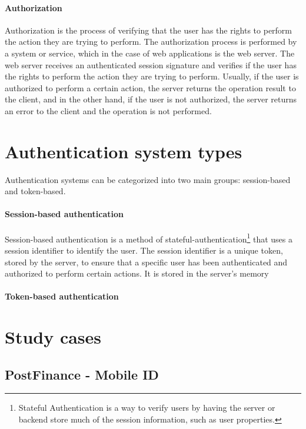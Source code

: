 \documentclass[12pt]{article}
\begin{document}
\paragraph{Authorization} Authorization is the process of verifying that the user has the rights to perform the action they are trying to perform. The authorization process is performed by a system or service, which in the case of web applications is the web server. The web server receives an authenticated session signature and verifies if the user has the rights to perform the action they are trying to perform. Usually, if the user is authorized to perform a certain action, the server returns the operation result to the client, and in the other hand, if the user is not authorized, the server returns an error to the client and the operation is not performed.

\pagebreak
\newpage

\section{Authentication system types}

Authentication systems can be categorized into two main groups: session-based and token-based.

\paragraph{Session-based authentication}
Session-based authentication is a method of stateful-authentication\footnote[1]{Stateful Authentication is a way to verify users by having the server or backend store much of the session information, such as user properties.\cite{website:1}} that uses a session identifier to identify the user. The session identifier is a unique token, stored by the server, to ensure that a specific user has been authenticated and authorized to perform certain actions. It is stored in the server's memory 

\paragraph{Token-based authentication}


\pagebreak
\newpage

\section{Study cases}
\subsection{PostFinance - Mobile ID}
\end{document}
